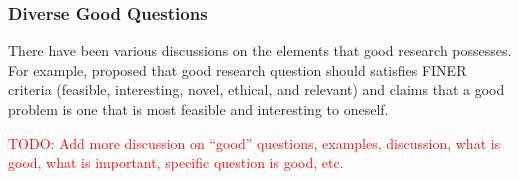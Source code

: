 \documentclass{book}
\begin{document}

\subsubsection{Diverse Good Questions}
There have been various discussions on the elements that good research possesses. For example, \cite{hulley2007designing} proposed that good research question should satisfies FINER criteria (feasible, interesting, novel, ethical, and relevant) and \cite{alon2009choose} claims that a good problem is one that is most feasible and interesting to oneself.

\textcolor{red}{TODO: Add more discussion on ``good'' questions, examples, discussion, what is good, what is important, specific question is good, etc.}




\end{document}
